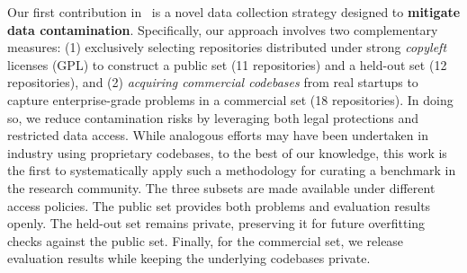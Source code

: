 Our first contribution in \benchmarkname~is a novel data collection strategy designed to \textbf{mitigate data contamination}. Specifically, our approach involves two complementary measures: (1) exclusively selecting repositories distributed under strong \emph{copyleft} licenses (GPL) to construct a public set (11 repositories) and a held-out set (12 repositories), and (2) \emph{acquiring commercial codebases} from real startups to capture enterprise-grade problems in a commercial set (18 repositories). In doing so, we reduce contamination risks by leveraging both legal protections and restricted data access. While analogous efforts may have been undertaken in industry using proprietary codebases, to the best of our knowledge, this work is the first to systematically apply such a methodology for curating a benchmark in the research community. The three subsets are made available under different access policies. The public set provides both problems and evaluation results openly. The held-out set remains private, preserving it for future overfitting checks against the public set. Finally, for the commercial set, we release evaluation results while keeping the underlying codebases private.




 

